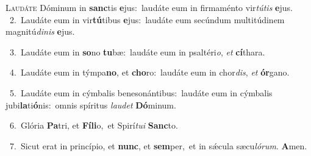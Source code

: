 \lettrine{\initial\textcolor{\initialcolor}{L}}{audáte} Dóminum in \textbf{sanc}\-tis \textbf{e}\-jus:~\star laudáte eum in firmaménto vir\-\textit{tú}\-\textit{tis} \textbf{e}\-jus.\\
{\numbfont\textcolor{\numbcolor}{~2.}}~Laudáte eum in vir\-\textbf{tú}\-tibus \textbf{e}\-jus:~\star laudáte eum secúndum multitúdinem magnitú\-\textit{di}\-\textit{nis} \textbf{e}\-jus.\par
{\numbfont\textcolor{\numbcolor}{~3.}}~Laudáte eum in \textbf{so}\-no \textbf{tu}\-bæ:~\star laudáte eum in psaltéri\-\textit{o}\-, \textit{et} \textbf{cí}\-thara.\par
{\numbfont\textcolor{\numbcolor}{~4.}}~Laudáte eum in týmpa\-\textbf{no}\-, et \textbf{cho}\-ro:~\star laudáte eum in chor\-\textit{dis}\-, \textit{et} \textbf{ór}\-gano.\par
{\numbfont\textcolor{\numbcolor}{~5.}}~Laudáte eum in cýmbalis benesonántibus:~\dagger laudáte eum in cýmbalis jubi\-\textbf{la}\-ti\-\textbf{ó}\-nis:~\star omnis spíritus \textit{lau}\-\textit{det} \textbf{Dó}\-minum.\par
{\numbfont\textcolor{\numbcolor}{~6.}}~Glória \textbf{Pa}\-tri, et \textbf{Fí}\-\textbf{li}o,~\star et Spirí\-\textit{tu}\-\textit{i} \textbf{Sanc}\-to.\par
{\numbfont\textcolor{\numbcolor}{~7.}}~Sicut erat in princípio, et \textbf{nunc}\-, et \textbf{sem}\-per,~\star et in sǽcula sæcu\-\textit{ló}\-\textit{rum}. \textbf{A}\-men.\par
